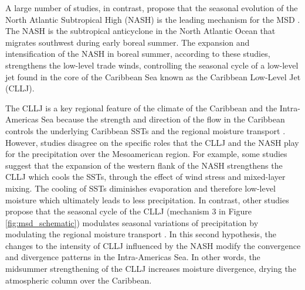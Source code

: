 A large number of studies, in contrast, propose that the seasonal evolution of the North Atlantic Subtropical High (NASH) is the leading mechanism for the MSD \citep[e.g.][]{mapes2005,small2007,gamble2008,curtis2008,munoz2008,martinez2019,corrales2020}. The NASH is the subtropical anticyclone in the North Atlantic Ocean that migrates southwest during early boreal summer. The expansion and intensification of the NASH in boreal summer, according to these studies, strengthens the low-level trade winds, controlling the seasonal cycle of a low-level jet found in the core of the Caribbean Sea known as the Caribbean Low-Level Jet (CLLJ). 

The CLLJ is a key regional feature of the climate of the Caribbean and the Intra-Americas Sea  because the strength and direction of the flow in the Caribbean controls the underlying Caribbean SSTs and the regional moisture transport \citep{giannini2000,mestas2007,martinez2019,garcia2020sub}. 
 However, studies disagree on the specific roles that the CLLJ and the NASH play for the precipitation over the Mesoamerican region. 
 For example, some studies \citep[e.g.][]{giannini2000,mestas2007,gamble2008} suggest that  the expansion of the western flank of the NASH strengthens the CLLJ which cools the SSTs, through the effect of wind stress and mixed-layer mixing.
The cooling of SSTs diminishes evaporation and therefore low-level moisture which ultimately leads to less precipitation. In contrast, other studies propose that the seasonal cycle of the CLLJ (mechanism 3 in Figure \ref{fig:msd_schematic}) modulates seasonal variations of precipitation by modulating the regional moisture transport  \citep{small2007,munoz2008,herrera2015,duranquesada2017,martinez2019}. In this second hypothesis, the changes to the intensity of CLLJ influenced by the NASH modify the convergence and divergence patterns in the Intra-Americas Sea. In other words, the midsummer strengthening of the CLLJ increases moisture divergence, drying the atmospheric column over the Caribbean. 


 
    


